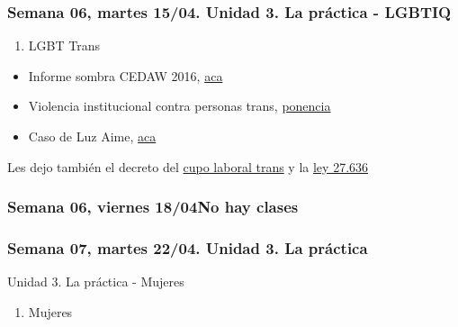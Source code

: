 \documentclass[
]{article}
\providecommand{\tightlist}{%
  \setlength{\itemsep}{0pt}\setlength{\parskip}{0pt}}
\begin{document}
\subsubsection{Semana 06, martes 15/04. Unidad 3. La práctica -
LGBTIQ}\label{semana-06-martes-1504.-unidad-3.-la-pruxe1ctica---lgbtiq}

\begin{enumerate}
\def\labelenumi{\alph{enumi}.}
\setcounter{enumi}{3}
\tightlist
\item
  LGBT Trans
\end{enumerate}

\begin{itemize}
\item
  Informe sombra CEDAW 2016,
  \href{https://drive.google.com/file/d/1Zv0TtTTzgt5N4vSBEo3F7UjiayBQ2BIx/view?usp=sharing}{aca}
\item
  Violencia institucional contra personas trans,
  \href{https://drive.google.com/file/d/1NWDuVTHVpSSWbHTuvP6WPAy6waXvDyXo/view}{ponencia}
\item
  Caso de Luz Aime,
  \href{https://www.cosecharoja.org/absolucion-para-luz-le-quieren-dar-perpetua-por-trans-y-pobre/}{aca}
\end{itemize}

Les dejo también el decreto del
\href{http://servicios.infoleg.gob.ar/infolegInternet/anexos/340000-344999/341808/norma.htm}{cupo
laboral trans} y la
\href{http://servicios.infoleg.gob.ar/infolegInternet/anexos/350000-354999/351815/norma.htm}{ley
27.636}

\subsubsection{Semana 06, viernes 18/04No hay
clases}\label{semana-06-viernes-1804no-hay-clases}

\subsubsection{Semana 07, martes 22/04. Unidad 3. La
práctica}\label{semana-07-martes-2204.-unidad-3.-la-pruxe1ctica}

Unidad 3. La práctica - Mujeres

\begin{enumerate}
\def\labelenumi{\alph{enumi}.}
\setcounter{enumi}{4}
\tightlist
\item
  Mujeres
\end{enumerate}
\end{document}
